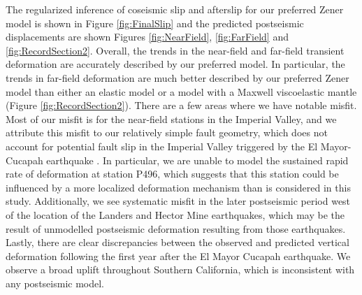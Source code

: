 \documentclass[review]{elsarticle}
\begin{document}
The regularized inference of coseismic slip and afterslip for our preferred Zener model is shown in Figure \ref{fig:FinalSlip} and the predicted postseismic displacements are shown Figures \ref{fig:NearField}, \ref{fig:FarField} and \ref{fig:RecordSection2}.  Overall, the trends in the near-field and far-field transient deformation are accurately described by our preferred model.  In particular, the trends in far-field deformation are much better described by our preferred Zener model than either an elastic model or a model with a Maxwell viscoelastic mantle (Figure \ref{fig:RecordSection2}).  There are a few areas where we have notable misfit.  Most of our misfit is for the near-field stations in the Imperial Valley, and we attribute this misfit to our relatively simple fault geometry, which does not account for potential fault slip in the Imperial Valley triggered by the El Mayor-Cucapah earthquake \citep{Wei2011a,Wei2015}. In particular, we are unable to model the sustained rapid rate of deformation at station P496, which suggests that this station could be influenced by a more localized deformation mechanism than is considered in this study.
Additionally, we see systematic misfit in the later postseismic period west of the location of the Landers and Hector Mine earthquakes, which may be the result of unmodelled postseismic deformation resulting from those earthquakes.  Lastly, there are clear discrepancies between the observed and predicted vertical deformation following the first year after the El Mayor Cucapah earthquake. We observe a broad uplift throughout Southern California, which is inconsistent with any postseismic model.
\end{document}
